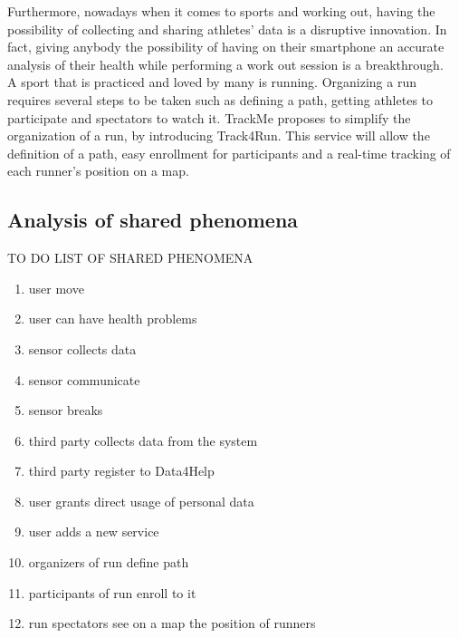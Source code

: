 \documentclass[../../rasd.tex]{subfiles}
\begin{document}
Furthermore, nowadays when it comes to sports and working out, having the possibility of collecting and sharing athletes' data is a disruptive innovation. In fact, giving anybody the possibility of having on their smartphone an accurate analysis of their health while performing a work out session is a breakthrough.\\
A sport that is practiced and loved by many is running. Organizing a run requires several steps to be taken such as defining a path, getting athletes to participate and spectators to watch it. TrackMe proposes to simplify the organization of a run, by introducing Track4Run. This service will allow the definition of a path, easy enrollment for participants and a real-time tracking of each runner’s position on a map.
			\subsection{Analysis of shared phenomena}
			TO DO LIST OF SHARED PHENOMENA
			
		\begin{enumerate}
		\item user move
		\item user can have health problems
		\item sensor collects data
		\item sensor communicate
		\item sensor breaks
		\item third party collects data from the system
		\item third party register to Data4Help
		\item user grants direct usage of personal data
		\item user adds a new service
		\item organizers of run define path
		\item participants of run enroll to it
		\item run spectators see on a map the position of runners
		
		\end{enumerate}
\end{document}
